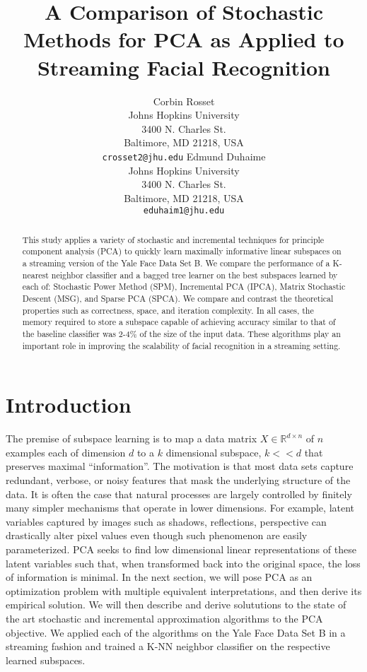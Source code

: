 \documentclass[11pt,letterpaper]{article}
\title{A Comparison of Stochastic Methods for PCA as Applied to Streaming Facial Recognition\Thanks{We would like to thank Dr. Raman Arora for his work on stochastic algorithms for manifold learning.}}
\author{Corbin Rosset\\
  Johns Hopkins University\\
  3400 N. Charles St.\\
  Baltimore, MD 21218, USA\\
  {\tt crosset2@jhu.edu}
  \And
  Edmund Duhaime \\
  Johns Hopkins University\\
  3400 N. Charles St.\\
  Baltimore, MD 21218, USA\\
  {\tt eduhaim1@jhu.edu}}
\date{}
\begin{document}
\maketitle
\begin{abstract}
  This study applies a variety of stochastic and incremental techniques for principle component analysis (PCA) to quickly learn maximally informative linear subspaces on a streaming version of the Yale Face Data Set B. We compare the performance of a K-nearest neighbor classifier and a bagged tree learner on the best subspaces learned by each of: Stochastic Power Method (SPM), Incremental PCA (IPCA), Matrix Stochastic Descent (MSG), and Sparse PCA (SPCA). We compare and contrast the theoretical properties such as correctness, space, and iteration complexity. In all cases, the memory required to store a subspace capable of achieving accuracy similar to that of the baseline classifier was  2-4$\%$ of the size of the input data. These algorithms play an important role in improving the scalability of facial recognition in a streaming setting. 
\end{abstract}

\section{Introduction}

The premise of subspace learning is to map a data matrix $X \in \mathbb{R}^{d \times n}$ of $n$ examples each of dimension $d$ to a $k$ dimensional subspace, $k << d$ that preserves maximal ``information''. The motivation is that most data sets capture redundant, verbose, or noisy features that mask the underlying structure of the data.  It is often the case that natural processes are largely controlled by finitely many simpler mechanisms that operate in lower dimensions. For example, latent variables captured by images such as shadows, reflections, perspective can drastically alter pixel values even though such phenomenon are easily parameterized. PCA seeks to find low dimensional linear representations of these latent variables such that, when transformed back into the original space, the loss of information is minimal. In the next section, we will pose PCA as an optimization problem with multiple equivalent interpretations, and then derive its empirical solution. We will then describe and derive solututions to the state of the art stochastic and incremental approximation algorithms to the PCA objective. We applied each of the algorithms on the Yale Face Data Set B in a streaming fashion and trained a K-NN neighbor classifier on the respective learned subspaces. 
\end{document}
